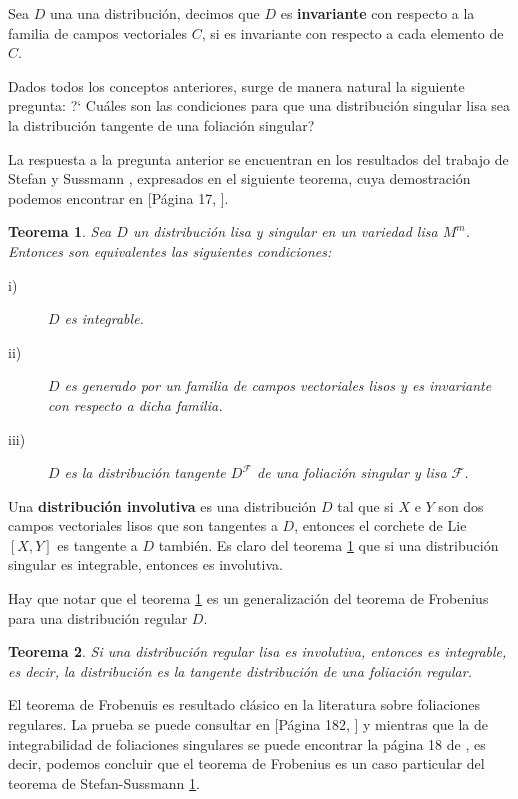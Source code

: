 \documentclass[a4paper,10pt]{book}
\newtheorem{teo}{Teorema}[chapter]
\begin{document}
Sea $D$ una una distribuci\'on, decimos que $D$ es {\bfseries invariante} con respecto a la familia de campos vectoriales $C$, si es invariante con respecto a cada elemento de $C$.
\vspace{5mm}

Dados todos los conceptos anteriores, surge de manera natural la siguiente pregunta: ?` Cu\'ales son las condiciones para que una distribuci\'on singular lisa sea la distribuci\'on tangente de una foliaci\'on singular?
\vspace{5mm}

La respuesta a la pregunta anterior se encuentran en los resultados del trabajo de Stefan \cite{Stefan74} y Sussmann \cite{Sussmann73}, expresados en el siguiente teorema, cuya demostraci\'on podemos encontrar en [P\'agina 17, \cite{Dufour}].
\begin{teo}\label{teoSteSus}
Sea $D$ un distribuci\'on lisa y singular en un variedad lisa $M^{m}$. Entonces son equivalentes las siguientes condiciones:
\begin{description}
    \item[i)] $D$ es integrable.
    \item[ii)] $D$ es generado por un familia de campos vectoriales lisos y es invariante con respecto a dicha familia.
    \item[iii)] $D$ es la distribuci\'on tangente $D^{\mathcal{F}}$ de una foliaci\'on singular y lisa $\mathcal{F}$. 
\end{description}
\end{teo}

Una {\bfseries distribuci\'on involutiva} es una distribuci\'on $D$ tal que si $X$ e $Y$ son dos campos vectoriales lisos que son tangentes a $D$, entonces el corchete de Lie $[X,Y]$ es tangente a $D$ tambi\'en. Es claro del teorema \ref{teoSteSus} que si una distribuci\'on singular es integrable, entonces es involutiva.
\vspace{5mm}

Hay que notar que el teorema \ref{teoSteSus} es un generalizaci\'on del teorema de Frobenius para una distribuci\'on regular $D$.

\begin{teo}\label{TeoFro}
Si una distribuci\'on regular lisa es involutiva, entonces es integrable, es decir, la distribuci\'on es la tangente distribuci\'on de una foliaci\'on regular.  
\end{teo}

El teorema de Frobenuis es resultado cl\'asico en la literatura sobre foliaciones regulares. La prueba se puede consultar en [P\'agina 182, \cite{Camacho}] y mientras que la de integrabilidad de foliaciones singulares se puede encontrar la p\'agina 18 de \cite{Dufour}, es decir, podemos concluir que el teorema de Frobenius es un caso particular del teorema de Stefan-Sussmann \ref{teoSteSus}.
\end{document}
